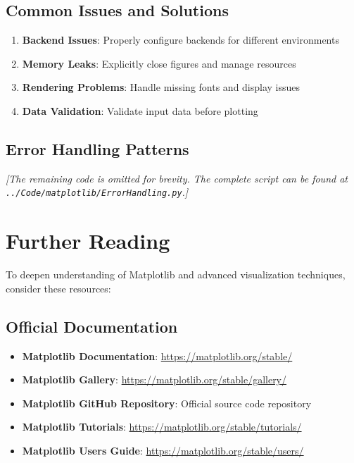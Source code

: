 \subsection{Common Issues and Solutions}
\label{subsec:common_issues}

\begin{enumerate}
	\item \textbf{Backend Issues}: Properly configure backends for different environments
	\item \textbf{Memory Leaks}: Explicitly close figures and manage resources
	\item \textbf{Rendering Problems}: Handle missing fonts and display issues
	\item \textbf{Data Validation}: Validate input data before plotting
\end{enumerate}

\subsection{Error Handling Patterns}
\label{subsec:matplotlib_error_patterns}



\noindent\textit{[The remaining code is omitted for brevity. The complete script can be found at \texttt{../Code/matplotlib/ErrorHandling.py}.]}

\section{Further Reading}
\label{sec:matplotlib_further_reading}

To deepen understanding of Matplotlib and advanced visualization techniques, consider these resources:

\subsection{Official Documentation}
\begin{itemize}
	\item \textbf{Matplotlib Documentation}: \url{https://matplotlib.org/stable/}
	\item \textbf{Matplotlib Gallery}: \url{https://matplotlib.org/stable/gallery/}
	\item \textbf{Matplotlib GitHub Repository}: Official source code repository \cite{Matplotlib:2024}
	\item \textbf{Matplotlib Tutorials}: \url{https://matplotlib.org/stable/tutorials/}
	\item \textbf{Matplotlib Users Guide}: \url{https://matplotlib.org/stable/users/}
\end{itemize}

